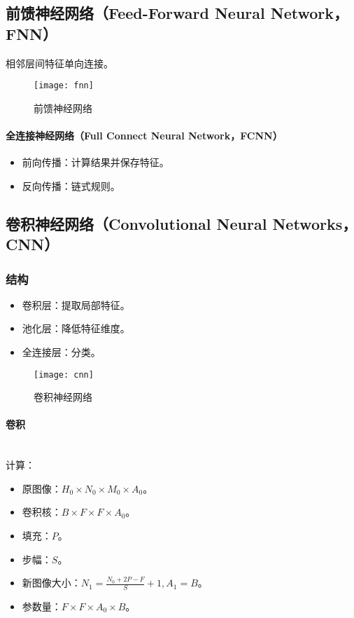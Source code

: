 \documentclass[
12pt, %
a4paper, 
oneside, %
headinclude,footinclude, %
]{scrartcl}
\begin{document}
\subsection[前馈神经网络]{前馈神经网络（Feed-Forward Neural Network，FNN）}
相邻层间特征单向连接。

\begin{figure}[H]
\centering 
\texttt{[image: fnn]} 
\caption{前馈神经网络}
\end{figure}
\paragraph{全连接神经网络（Full Connect Neural Network，FCNN）}
\begin{itemize}
\item 前向传播：计算结果并保存特征。
\item 反向传播：链式规则。
\end{itemize}
\subsection[卷积神经网络]{卷积神经网络（Convolutional Neural Networks，CNN）}
\subsubsection[结构]{结构}
\begin{itemize}
\item 卷积层：提取局部特征。
\item 池化层：降低特征维度。
\item 全连接层：分类。
\end{itemize}

\begin{figure}[H]
\centering 
\texttt{[image: cnn]} 
\caption{卷积神经网络}
\end{figure}
\paragraph{卷积}~\\

计算：
\begin{itemize}
\item 原图像：$ H_0 \times N_0 \times M_0 \times A_0 $。
\item 卷积核：$ B \times F \times F \times A_0 $。
\item 填充：$ P $。
\item 步幅：$ S $。
\item 新图像大小：$ N_1 = \frac{N_0 + 2P - F}{S} + 1, A_1 = B $。
\item 参数量：$ F \times F \times A_0 \times B $。
\end{itemize}
\end{document}
